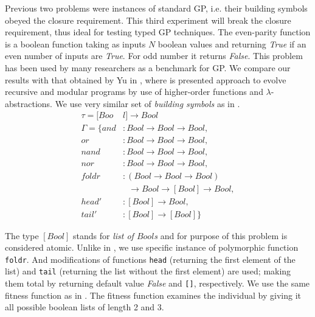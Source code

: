 \documentclass[conference]{IEEEtran}
\newcommand{\ar}{\rightarrow\xspace}
\begin{document}
Previous two problems were instances of standard GP, i.e. their building 
symbols obeyed the closure requirement. This third experiment will 
break the closure requirement, thus ideal for testing typed GP techniques. 
The even-parity function is a boolean function taking as inputs $N$
boolean values and returning \textit{True} if an even number of inputs 
are \textit{True}. For odd number it returns \textit{False}.
This problem has been used by many researchers
as a benchmark for GP. We compare our results with 
that obtained by Yu in \cite{yu01},
where is presented approach to evolve recursive and modular programs
by use of higher-order functions and $\lambda$-abstractions.
We use very similar set of \textit{building symbols} as in \cite{yu01}. 
\begin{align*}
\tau = [Boo&l] \ar Bool\\
\Gamma = \{
  and   &: Bool \ar Bool \ar Bool                              ,\\
  or    &: Bool \ar Bool \ar Bool                              ,\\
  nand  &: Bool \ar Bool \ar Bool                              ,\\
  nor   &: Bool \ar Bool \ar Bool                              ,\\
  foldr &: (Bool \ar Bool \ar Bool) \\
        &~~~\ar Bool \ar [Bool] \ar Bool ,\\
  head' &: [Bool] \ar Bool                                   ,\\
  tail' &: [Bool] \ar [Bool]                              \}
\end{align*}

The type $[Bool]$ stands for \textit{list of $Bool$s} and for purpose of
this problem is considered atomic.
Unlike in \cite{yu01}, we use specific instance of polymorphic 
function \texttt{foldr}. 
And modifications of functions \texttt{head} 
(returning the first element of the list) 
and \texttt{tail} (returning the list without the first element) are used; 
making them total by returning default value \textit{False}
and \texttt{[]}, respectively.
We use the same fitness function as in \cite{yu01}. 
The fitness function examines the individual by giving
it all possible boolean lists of length 2 and 3.
\end{document}
